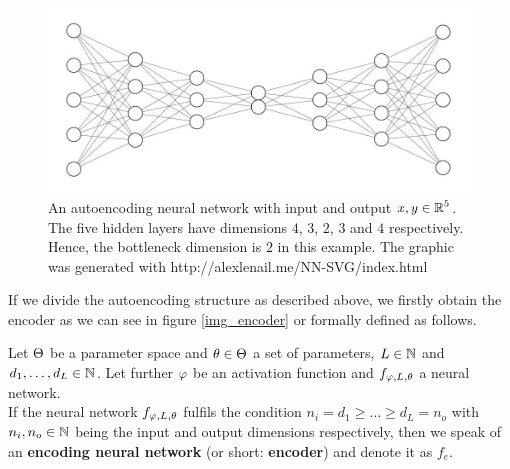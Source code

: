 \begin{figure}%
\begin{center}
   \begin{minipage}[b]{0.9\linewidth}
      \includegraphics[width=\linewidth]{autoencoder}
      \caption{An autoencoding neural network with input and output $x, y\in \operatorname{\mathbb{R}}^5$. The five hidden layers have dimensions $4$, $3$, $2$, $3$ and $4$ respectively. Hence, the bottleneck dimension is $2$ in this example. The graphic was generated with http://alexlenail.me/NN-SVG/index.html}\label{autoencoder}
	\end{minipage}
\end{center}
\end{figure}


If we divide the autoencoding structure as described above, we firstly obtain the encoder as we can see in figure \ref{img_encoder} or formally defined as follows.

\begin{definition}\label{def_encoder}
Let $\operatorname{\Theta}$ be a parameter space and $\theta \in \operatorname{\Theta}$ a set of parameters, $L\in \operatorname{\mathbb{N}}$ and $d_1,\ldots, d_L\in\operatorname{\mathbb{N}}$. Let further $\operatorname{\varphi}$ be an activation function and $f_{\operatorname{\varphi},L,\theta}$ a neural network.\\
If the neural network $f_{\operatorname{\varphi},L,\theta}$ fulfils the condition $n_i= d_1 \geq \ldots \geq d_L = n_o$ with $n_i, n_o \in \operatorname{\mathbb{N}}$ being the input and output dimensions respectively, then we speak of an \textbf{encoding neural network} (or short: \textbf{encoder}) and denote it as $f_e$.
\end{definition}


